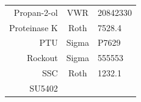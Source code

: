 \documentclass[11pt,singlespacinge,twoside]{reedthesis} %
\theoremstyle{definition}
\theoremstyle{definition}
\theoremstyle{definition}
\theoremstyle{remark}
\begin{document}
\begin{longtable}[]{@{}rcl@{}}
\begin{minipage}[t]{0.29\columnwidth}
Propan-2-ol\strut
\end{minipage} & \begin{minipage}[t]{0.33\columnwidth}\centering
VWR\strut
\end{minipage} & \begin{minipage}[t]{0.29\columnwidth}\raggedright
20842330\strut
\end{minipage}\tabularnewline
\begin{minipage}[t]{0.29\columnwidth}\raggedleft
Proteinase K\strut
\end{minipage} & \begin{minipage}[t]{0.33\columnwidth}\centering
Roth\strut
\end{minipage} & \begin{minipage}[t]{0.29\columnwidth}\raggedright
7528.4\strut
\end{minipage}\tabularnewline
\begin{minipage}[t]{0.29\columnwidth}\raggedleft
PTU\strut
\end{minipage} & \begin{minipage}[t]{0.33\columnwidth}\centering
Sigma\strut
\end{minipage} & \begin{minipage}[t]{0.29\columnwidth}\raggedright
P7629\strut
\end{minipage}\tabularnewline
\begin{minipage}[t]{0.29\columnwidth}\raggedleft
Rockout\strut
\end{minipage} & \begin{minipage}[t]{0.33\columnwidth}\centering
Sigma\strut
\end{minipage} & \begin{minipage}[t]{0.29\columnwidth}\raggedright
555553\strut
\end{minipage}\tabularnewline
\begin{minipage}[t]{0.29\columnwidth}\raggedleft
SSC\strut
\end{minipage} & \begin{minipage}[t]{0.33\columnwidth}\centering
Roth\strut
\end{minipage} & \begin{minipage}[t]{0.29\columnwidth}\raggedright
1232.1\strut
\end{minipage}\tabularnewline
\begin{minipage}[t]{0.29\columnwidth}\raggedleft
SU5402\strut
\end{minipage} & \begin{minipage}[t]{0.33\columnwidth}\centering

\end{minipage}
\end{longtable}
\end{document}
